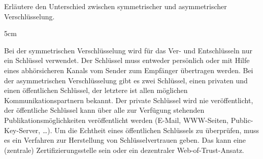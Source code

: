 \question[3]
Erläutere den Unterschied zwischen symmetrischer und asymmetrischer Verschlüsselung.  

\begin{solutionbox}{5cm}

Bei der symmetrischen Verschlüsselung wird für das Ver- und Entschlüsseln nur ein Schlüssel verwendet.
Der Schlüssel muss entweder persönlich oder mit Hilfe eines 
abhörsicheren Kanals vom Sender zum Empfänger übertragen werden.
Bei der asymmetrischen Verschlüsselung gibt es zwei Schlüssel, einen privaten und einen öffentlichen
Schlüssel, der letztere ist allen möglichen Kommunikationspartnern bekannt. Der private Schlüssel wird
nie veröffentlicht, der öffentliche Schlüssel kann über alle zur Verfügung stehenden Publikationsmöglichkeiten
veröffentlicht werden (E-Mail, WWW-Seiten, Public-Key-Server, …).
Um die Echtheit eines öffentlichen Schlüssels zu überprüfen, muss es ein Verfahren zur Herstellung von
Schlüsselvertrauen geben. Das kann eine (zentrale) Zertifizierungsstelle sein oder ein dezentraler
Web-of-Trust-Ansatz.

\end{solutionbox}
